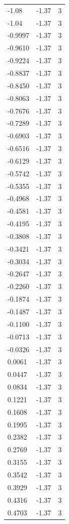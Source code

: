 \begin{longtable}{lrr}
  -1.08 & -1.37 & 3 \\
  -1.04 & -1.37 & 3 \\
  -0.9997 & -1.37 & 3 \\
  -0.9610 & -1.37 & 3 \\
  -0.9224 & -1.37 & 3 \\
  -0.8837 & -1.37 & 3 \\
  -0.8450 & -1.37 & 3 \\
  -0.8063 & -1.37 & 3 \\
  -0.7676 & -1.37 & 3 \\
  -0.7289 & -1.37 & 3 \\
  -0.6903 & -1.37 & 3 \\
  -0.6516 & -1.37 & 3 \\
  -0.6129 & -1.37 & 3 \\
  -0.5742 & -1.37 & 3 \\
  -0.5355 & -1.37 & 3 \\
  -0.4968 & -1.37 & 3 \\
  -0.4581 & -1.37 & 3 \\
  -0.4195 & -1.37 & 3 \\
  -0.3808 & -1.37 & 3 \\
  -0.3421 & -1.37 & 3 \\
  -0.3034 & -1.37 & 3 \\
  -0.2647 & -1.37 & 3 \\
  -0.2260 & -1.37 & 3 \\
  -0.1874 & -1.37 & 3 \\
  -0.1487 & -1.37 & 3 \\
  -0.1100 & -1.37 & 3 \\
  -0.0713 & -1.37 & 3 \\
  -0.0326 & -1.37 & 3 \\
  0.0061 & -1.37 & 3 \\
  0.0447 & -1.37 & 3 \\
  0.0834 & -1.37 & 3 \\
  0.1221 & -1.37 & 3 \\
  0.1608 & -1.37 & 3 \\
  0.1995 & -1.37 & 3 \\
  0.2382 & -1.37 & 3 \\
  0.2769 & -1.37 & 3 \\
  0.3155 & -1.37 & 3 \\
  0.3542 & -1.37 & 3 \\
  0.3929 & -1.37 & 3 \\
  0.4316 & -1.37 & 3 \\
  0.4703 & -1.37 & 3 \\

\end{longtable}

